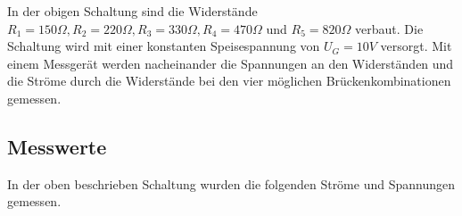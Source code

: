 \documentclass[
a4paper,     %
 headsepline, %
11pt         %
]{scrartcl}  %
\begin{document}
\begin{center}
\end{center}
In der obigen Schaltung sind die  Widerstände $R_1 = 150\Omega, R_2 = 220\Omega, R_3=330\Omega, R_4=470\Omega$ und $R_5=820\Omega$ verbaut.
Die Schaltung wird mit einer konstanten Speisespannung von $U_G=10V$ versorgt. 
Mit einem Messgerät werden nacheinander die Spannungen an den Widerständen und die Ströme durch die Widerstände bei den vier möglichen Brückenkombinationen gemessen.

\subsection{Messwerte}

In der oben beschrieben Schaltung wurden die folgenden Ströme und Spannungen gemessen. 
\end{document}
